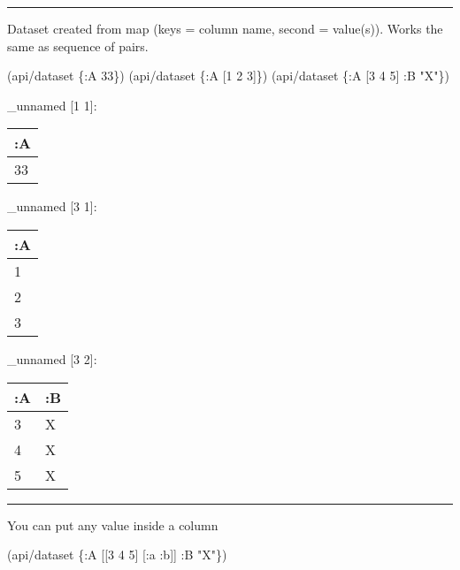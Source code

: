 \documentclass[]{article}
\newenvironment{Shaded}{\begin{snugshade}}{\end{snugshade}}
\newcommand{\DecValTok}[1]{\textcolor[rgb]{0.00,0.00,0.81}{#1}}
\newcommand{\StringTok}[1]{\textcolor[rgb]{0.31,0.60,0.02}{#1}}
\newcommand{\AttributeTok}[1]{\textcolor[rgb]{0.77,0.63,0.00}{#1}}
\newcommand{\NormalTok}[1]{#1}
\begin{document}
\begin{center}\rule{0.5\linewidth}{0.5pt}\end{center}

Dataset created from map (keys = column name, second = value(s)). Works
the same as sequence of pairs.

\begin{Shaded}
\begin{Highlighting}[]
\NormalTok{(api/dataset \{}\AttributeTok{:A} \DecValTok{33}\NormalTok{\})}
\NormalTok{(api/dataset \{}\AttributeTok{:A}\NormalTok{ [}\DecValTok{1} \DecValTok{2} \DecValTok{3}\NormalTok{]\})}
\NormalTok{(api/dataset \{}\AttributeTok{:A}\NormalTok{ [}\DecValTok{3} \DecValTok{4} \DecValTok{5}\NormalTok{] }\AttributeTok{:B} \StringTok{"X"}\NormalTok{\})}
\end{Highlighting}
\end{Shaded}

\_unnamed {[}1 1{]}:

\begin{longtable}[]{@{}l@{}}
\toprule
:A\tabularnewline
\midrule
\endhead
33\tabularnewline
\bottomrule
\end{longtable}

\_unnamed {[}3 1{]}:

\begin{longtable}[]{@{}l@{}}
\toprule
:A\tabularnewline
\midrule
\endhead
1\tabularnewline
2\tabularnewline
3\tabularnewline
\bottomrule
\end{longtable}

\_unnamed {[}3 2{]}:

\begin{longtable}[]{@{}ll@{}}
\toprule
:A & :B\tabularnewline
\midrule
\endhead
3 & X\tabularnewline
4 & X\tabularnewline
5 & X\tabularnewline
\bottomrule
\end{longtable}

\begin{center}\rule{0.5\linewidth}{0.5pt}\end{center}

You can put any value inside a column

\begin{Shaded}
\begin{Highlighting}[]
\NormalTok{(api/dataset \{}\AttributeTok{:A}\NormalTok{ [[}\DecValTok{3} \DecValTok{4} \DecValTok{5}\NormalTok{] [}\AttributeTok{:a} \AttributeTok{:b}\NormalTok{]] }\AttributeTok{:B} \StringTok{"X"}\NormalTok{\})}
\end{Highlighting}
\end{Shaded}
\end{document}
